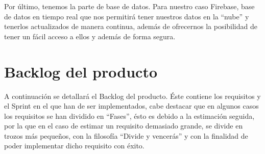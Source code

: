 \documentclass[11pt,openany]{book}
\begin{document}
Por último, tenemos la parte de base de datos. Para nuestro caso Firebase, base de datos en tiempo real que nos permitirá tener nuestros datos en la ``nube'' y tenerlos actualizados de manera continua, además de ofrecernos la posibilidad de tener un fácil acceso a ellos y además de forma segura.

\section{Backlog del producto}

A continuación se detallará el Backlog del producto. Éste contiene los requisitos y el Sprint en el que han de ser implementados, cabe destacar que en algunos casos los requisitos se han dividido en ``Fases'', ésto es debido a la estimación seguida, por la que en el caso de estimar un requisito demasiado grande, se divide en trozos más pequeños, con la filosofía ``Divide y vencerás'' y con la finalidad de poder implementar dicho requisito con éxito. 
\end{document}
